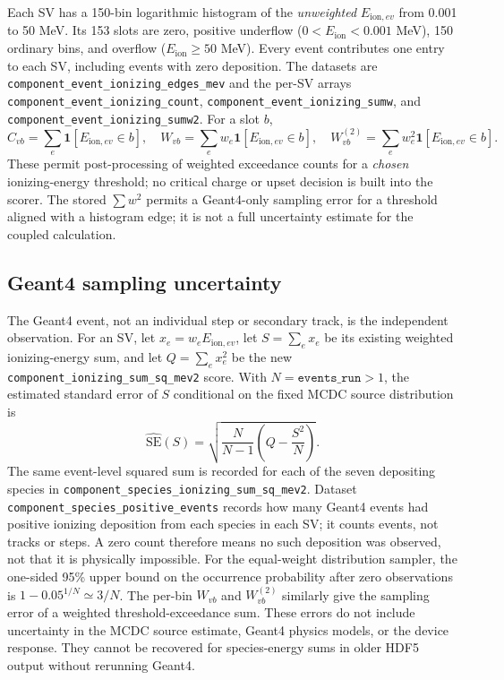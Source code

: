 \documentclass[11pt]{article}
\begin{document}
Each SV has a 150-bin logarithmic histogram of the \emph{unweighted}
$E_{\mathrm{ion},ev}$ from 0.001 to 50 MeV. Its 153 slots are zero,
positive underflow ($0<E_{\mathrm{ion}}<0.001$ MeV), 150 ordinary bins,
and overflow ($E_{\mathrm{ion}}\geq 50$ MeV). Every event contributes one
entry to each SV, including events with zero deposition. The datasets are
\texttt{component\_event\_ionizing\_edges\_mev} and the per-SV arrays
\texttt{component\_event\_ionizing\_count},
\texttt{component\_event\_ionizing\_sumw}, and
\texttt{component\_event\_ionizing\_sumw2}. For a slot $b$,
\begin{equation}
 C_{vb}=\sum_e \mathbf{1}[E_{\mathrm{ion},ev}\in b],\quad
 W_{vb}=\sum_e w_e\mathbf{1}[E_{\mathrm{ion},ev}\in b],\quad
 W^{(2)}_{vb}=\sum_e w_e^2\mathbf{1}[E_{\mathrm{ion},ev}\in b].
\end{equation}
These permit post-processing of weighted exceedance counts for a \emph{chosen}
ionizing-energy threshold; no critical charge or upset decision is built into
the scorer. The stored $\sum w^2$ permits a Geant4-only sampling error for a
threshold aligned with a histogram edge; it is not a full uncertainty estimate
for the coupled calculation.

\subsection{Geant4 sampling uncertainty}

The Geant4 event, not an individual step or secondary track, is the independent
observation. For an SV, let $x_e=w_e E_{\mathrm{ion},ev}$, let
$S=\sum_e x_e$ be its existing weighted ionizing-energy sum, and let
$Q=\sum_e x_e^2$ be the new
\texttt{component\_ionizing\_sum\_sq\_mev2} score. With
$N=\texttt{events\_run}>1$, the estimated standard error of $S$ conditional
on the fixed MCDC source distribution is
\begin{equation}
 \widehat{\mathrm{SE}}(S)
 =\sqrt{\frac{N}{N-1}\left(Q-\frac{S^2}{N}\right)}.
\end{equation}
The same event-level squared sum is recorded for each of the seven depositing
species in \texttt{component\_species\_ionizing\_sum\_sq\_mev2}. Dataset
\texttt{component\_species\_positive\_events} records how many Geant4
events had positive ionizing deposition from each species in each SV; it
counts events, not tracks or steps. A zero count therefore means no such
deposition was observed, not that it is physically impossible. For the
equal-weight distribution sampler, the one-sided 95\% upper bound on the
occurrence probability after zero observations is
$1-0.05^{1/N}\simeq 3/N$. The per-bin $W_{vb}$ and $W^{(2)}_{vb}$ similarly
give the sampling error of a weighted threshold-exceedance sum. These errors
do not include uncertainty in the MCDC source estimate, Geant4 physics
models, or the device response. They cannot be recovered for species-energy
sums in older HDF5 output without rerunning Geant4.
\end{document}
